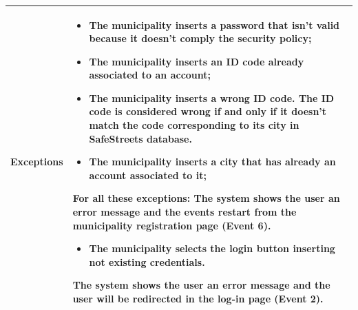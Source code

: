 \documentclass[titlepage]{article}
\begin{document}
\begin{longtable}{| p{3 cm} | p{10 cm} |}
\textbf{Exceptions} & 
\begin{itemize}
	\item The municipality inserts a password that isn't valid because it doesn't comply the security policy;
	\item The municipality inserts an ID code already associated to an account;
	\item The municipality inserts a wrong ID code. The ID code is considered wrong if and only if it doesn't match the code corresponding to its city in SafeStreets database.
	
	\item The municipality inserts a city that has already an account associated to it;
\end{itemize} 
	
							
For all these exceptions: The system shows the user an error message and the events restart from the municipality registration page (Event 6).


\begin{itemize}
\item The municipality selects the login button inserting not existing credentials.
\end{itemize} 
The system shows the user an error message and the user will be redirected in the log-in page (Event 2).
\\ \hline

\end{longtable}

\newpage
\end{document}
